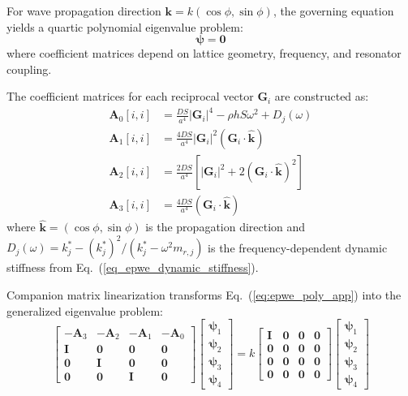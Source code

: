 \documentclass[review,numbers,sort&compress]{elsarticle}
\begin{document}
For wave propagation direction $\mathbf{k} = k(\cos\phi, \sin\phi)$, the governing equation yields a quartic polynomial eigenvalue problem:
\begin{equation}
[\mathbf{A}_3 k^3 + \mathbf{A}_2 k^2 + \mathbf{A}_1 k + \mathbf{A}_0]\boldsymbol{\psi} = \mathbf{0}
\label{eq:epwe_poly_app}
\end{equation}
where coefficient matrices depend on lattice geometry, frequency, and resonator coupling.

The coefficient matrices for each reciprocal vector $\mathbf{G}_i$ are constructed as:
\begin{align}
\mathbf{A}_0[i,i] &= \frac{DS}{a^4}|\mathbf{G}_i|^4 - \rho h S \omega^2 + D_j(\omega) \label{eq:A0_app}\\
\mathbf{A}_1[i,i] &= \frac{4DS}{a^4}|\mathbf{G}_i|^2(\mathbf{G}_i \cdot \hat{\mathbf{k}}) \label{eq:A1_app}\\
\mathbf{A}_2[i,i] &= \frac{2DS}{a^4}[|\mathbf{G}_i|^2 + 2(\mathbf{G}_i \cdot \hat{\mathbf{k}})^2] \label{eq:A2_app}\\
\mathbf{A}_3[i,i] &= \frac{4DS}{a^4}(\mathbf{G}_i \cdot \hat{\mathbf{k}}) \label{eq:A3_app}
\end{align}
where $\hat{\mathbf{k}} = (\cos\phi, \sin\phi)$ is the propagation direction and $D_j(\omega) = k_j^* - (k_j^*)^2/(k_j^* - \omega^2 m_{r,j})$ is the frequency-dependent dynamic stiffness from Eq.~(\ref{eq_epwe_dynamic_stiffness}).

Companion matrix linearization transforms Eq.~(\ref{eq:epwe_poly_app}) into the generalized eigenvalue problem:
\begin{equation}
\begin{bmatrix}
-\mathbf{A}_3 & -\mathbf{A}_2 & -\mathbf{A}_1 & -\mathbf{A}_0 \\
\mathbf{I} & \mathbf{0} & \mathbf{0} & \mathbf{0} \\
\mathbf{0} & \mathbf{I} & \mathbf{0} & \mathbf{0} \\
\mathbf{0} & \mathbf{0} & \mathbf{I} & \mathbf{0}
\end{bmatrix}
\begin{bmatrix}
\boldsymbol{\psi}_1 \\ \boldsymbol{\psi}_2 \\ \boldsymbol{\psi}_3 \\ \boldsymbol{\psi}_4
\end{bmatrix} = k
\begin{bmatrix}
\mathbf{I} & \mathbf{0} & \mathbf{0} & \mathbf{0} \\
\mathbf{0} & \mathbf{0} & \mathbf{0} & \mathbf{0} \\
\mathbf{0} & \mathbf{0} & \mathbf{0} & \mathbf{0} \\
\mathbf{0} & \mathbf{0} & \mathbf{0} & \mathbf{0}
\end{bmatrix}
\begin{bmatrix}
\boldsymbol{\psi}_1 \\ \boldsymbol{\psi}_2 \\ \boldsymbol{\psi}_3 \\ \boldsymbol{\psi}_4
\end{bmatrix}
\label{eq:companion_app}
\end{equation}
\end{document}
